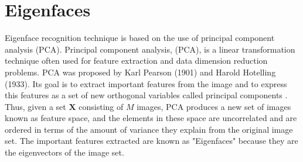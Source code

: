 \section{Eigenfaces}
Eigenface recognition technique is based on the use of principal component analysis (PCA). Principal component analysis, (PCA), is a linear transformation technique often used for feature extraction and data dimension reduction problems. PCA was proposed by Karl Pearson (1901) and Harold Hotelling (1933).  Its goal is to extract important features from the image and to express this features as a set of new orthogonal variables called principal components \citep{turk19}. Thus, given  a set $\mathbf{X}$ consisting of $M$ images, PCA produces a new set of images known as feature space, and the elements in these space are uncorrelated and are ordered in terms of the amount of variance they explain from the original image set. The important features extracted are known as "Eigenfaces" because they are the eigenvectors of the image set.




